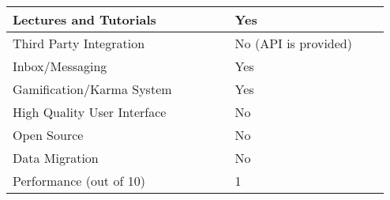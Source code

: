 \begin{table}[ht]
{\begin{tabular}{llllllll}
    \multicolumn{1}{|l|}{Lectures and Tutorials}      & \multicolumn{1}{l|}{} & \multicolumn{1}{l|}{} & \multicolumn{1}{l|}{} & \multicolumn{1}{l|}{} & \multicolumn{1}{l|}{Yes}                       & \multicolumn{1}{l|}{} & \multicolumn{1}{l|}{} \\ \hline
    \multicolumn{1}{|l|}{Third Party Integration}     & \multicolumn{1}{l|}{} & \multicolumn{1}{l|}{} & \multicolumn{1}{l|}{} & \multicolumn{1}{l|}{} & \multicolumn{1}{l|}{No (API is provided)}      & \multicolumn{1}{l|}{} & \multicolumn{1}{l|}{} \\ \hline
    \multicolumn{1}{|l|}{Inbox/Messaging}             & \multicolumn{1}{l|}{} & \multicolumn{1}{l|}{} & \multicolumn{1}{l|}{} & \multicolumn{1}{l|}{} & \multicolumn{1}{l|}{Yes}                       & \multicolumn{1}{l|}{} & \multicolumn{1}{l|}{} \\ \hline
    \multicolumn{1}{|l|}{Gamification/Karma System}   & \multicolumn{1}{l|}{} & \multicolumn{1}{l|}{} & \multicolumn{1}{l|}{} & \multicolumn{1}{l|}{} & \multicolumn{1}{l|}{Yes}                       & \multicolumn{1}{l|}{} & \multicolumn{1}{l|}{} \\ \hline
    \multicolumn{1}{|l|}{High Quality User Interface} & \multicolumn{1}{l|}{} & \multicolumn{1}{l|}{} & \multicolumn{1}{l|}{} & \multicolumn{1}{l|}{} & \multicolumn{1}{l|}{No}                        & \multicolumn{1}{l|}{} & \multicolumn{1}{l|}{} \\ \hline
    \multicolumn{1}{|l|}{Open Source}                 & \multicolumn{1}{l|}{} & \multicolumn{1}{l|}{} & \multicolumn{1}{l|}{} & \multicolumn{1}{l|}{} & \multicolumn{1}{l|}{No}                        & \multicolumn{1}{l|}{} & \multicolumn{1}{l|}{} \\ \hline
    \multicolumn{1}{|l|}{Data Migration}              & \multicolumn{1}{l|}{} & \multicolumn{1}{l|}{} & \multicolumn{1}{l|}{} & \multicolumn{1}{l|}{} & \multicolumn{1}{l|}{No}                        & \multicolumn{1}{l|}{} & \multicolumn{1}{l|}{} \\ \hline
    Performance (out of 10)                           &                       &                       &                       &                       & 1                                              &                       &                       \\ \hline
    \end{tabular}}
    \end{table}
